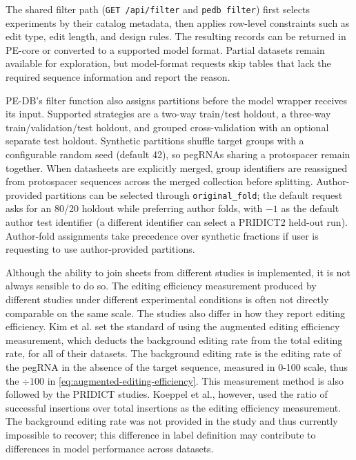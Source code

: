 \documentclass{article}
\begin{document}
The shared filter path (\nolinkurl{GET /api/filter} and \nolinkurl{pedb filter}) first selects experiments by their catalog metadata, then applies row-level constraints such as edit type, edit length, and design rules. The resulting records can be returned in PE-core or converted to a supported model format. Partial datasets remain available for exploration, but model-format requests skip tables that lack the required sequence information and report the reason.

PE-DB's filter function also assigns partitions before the model wrapper receives its input. Supported strategies are a two-way train/test holdout, a three-way train/validation/test holdout, and grouped cross-validation with an optional separate test holdout. Synthetic partitions shuffle target groups with a configurable random seed (default 42), so pegRNAs sharing a protospacer remain together. When datasheets are explicitly merged, group identifiers are reassigned from protospacer sequences across the merged collection before splitting. Author-provided partitions can be selected through \nolinkurl{original_fold}; the default request asks for an 80/20 holdout while preferring author folds, with $-1$ as the default author test identifier (a different identifier can select a PRIDICT2 held-out run). Author-fold assignments take precedence over synthetic fractions if user is requesting to use author-provided partitions.

Although the ability to join sheets from different studies is implemented, it is not always sensible to do so. The editing efficiency measurement produced by different studies under different experimental conditions is often not directly comparable on the same scale\cite{schwankgeraldPredictingPrimeEditing2023}.
The studies also differ in how they report editing efficiency. Kim et al. set the standard of using the augmented editing efficiency measurement, which deducts the background editing rate from the total editing rate, for all of their datasets\cite{kimPredictingEfficiencyPrime2021,yuPredictionEfficienciesDiverse2023}. The background editing rate is the editing rate of the pegRNA in the absence of the target sequence, measured in 0-100 scale, thus the $\div 100$ in \autoref{eq:augmented-editing-efficiency}. This measurement method is also followed by the PRIDICT studies\cite{schwankgeraldPredictingPrimeEditing2023,mathisMachineLearningPrediction2024}. Koeppel et al., however, used the ratio of successful insertions over total insertions as the editing efficiency measurement. The background editing rate was not provided in the study and thus currently impossible to recover; this difference in label definition may contribute to differences in model performance across datasets. 
\end{document}
